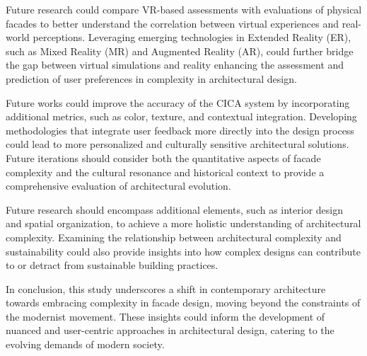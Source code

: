 
Future research could compare VR-based assessments with evaluations of physical facades to better understand the correlation between virtual experiences and real-world perceptions.
Leveraging emerging technologies in Extended Reality (ER), such as Mixed Reality (MR) and Augmented Reality (AR), could further bridge the gap between virtual simulations and reality enhancing the assessment and prediction of user preferences in complexity in architectural design.


Future works could improve the accuracy of the CICA system by incorporating additional metrics, such as color, texture, and contextual integration.
Developing methodologies that integrate user feedback more directly into the design process could lead to more personalized and culturally sensitive architectural solutions.
Future iterations should consider both the quantitative aspects of facade complexity and the cultural resonance and historical context to provide a comprehensive evaluation of architectural evolution.


Future research should encompass additional elements, such as interior design and spatial organization, to achieve a more holistic understanding of architectural complexity.
Examining the relationship between architectural complexity and sustainability could also provide insights into how complex designs can contribute to or detract from sustainable building practices.

In conclusion, this study underscores a shift in contemporary architecture towards embracing complexity in facade design, moving beyond the constraints of the modernist movement.
These insights could inform the development of nuanced and user-centric approaches in architectural design, catering to the evolving demands of modern society.

